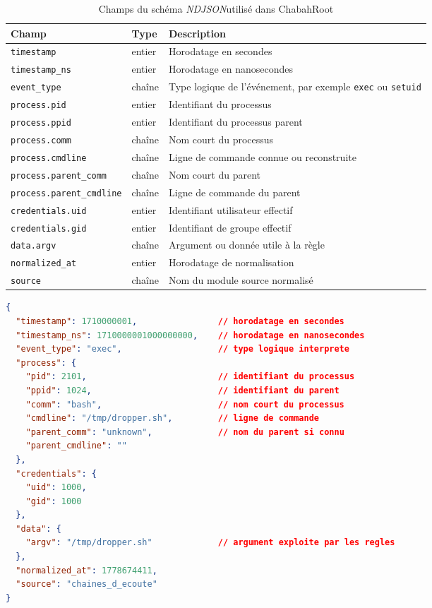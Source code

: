 \documentclass[12pt,a4paper]{report}
\newcommand{\ndjson}{\textit{NDJSON}}
\begin{document}
\begin{table}[h]
\centering
\begin{tabular}{>{\raggedright\arraybackslash}p{3.5cm} >{\raggedright\arraybackslash}p{2.5cm} >{\raggedright\arraybackslash}p{6.5cm}}
\toprule
Champ & Type & Description \\
\midrule
\texttt{timestamp} & entier & Horodatage en secondes \\
\texttt{timestamp\_ns} & entier & Horodatage en nanosecondes \\
\texttt{event\_type} & chaîne & Type logique de l’événement, par exemple \texttt{exec} ou \texttt{setuid} \\
\texttt{process.pid} & entier & Identifiant du processus \\
\texttt{process.ppid} & entier & Identifiant du processus parent \\
\texttt{process.comm} & chaîne & Nom court du processus \\
\texttt{process.cmdline} & chaîne & Ligne de commande connue ou reconstruite \\
\texttt{process.parent\_comm} & chaîne & Nom court du parent \\
\texttt{process.parent\_cmdline} & chaîne & Ligne de commande du parent \\
\texttt{credentials.uid} & entier & Identifiant utilisateur effectif \\
\texttt{credentials.gid} & entier & Identifiant de groupe effectif \\
\texttt{data.argv} & chaîne & Argument ou donnée utile à la règle \\
\texttt{normalized\_at} & entier & Horodatage de normalisation \\
\texttt{source} & chaîne & Nom du module source normalisé \\
\bottomrule
\end{tabular}
\caption{Champs du schéma \ndjson utilisé dans ChabahRoot}
\end{table}

\begin{lstlisting}[language=json,caption={Exemple commenté d’un événement \ndjson normalisé},label={lst:ndjson-exemple}]
{
  "timestamp": 1710000001,                // horodatage en secondes
  "timestamp_ns": 1710000001000000000,    // horodatage en nanosecondes
  "event_type": "exec",                   // type logique interprete
  "process": {
    "pid": 2101,                          // identifiant du processus
    "ppid": 1024,                         // identifiant du parent
    "comm": "bash",                       // nom court du processus
    "cmdline": "/tmp/dropper.sh",         // ligne de commande
    "parent_comm": "unknown",             // nom du parent si connu
    "parent_cmdline": ""
  },
  "credentials": {
    "uid": 1000,
    "gid": 1000
  },
  "data": {
    "argv": "/tmp/dropper.sh"             // argument exploite par les regles
  },
  "normalized_at": 1778674411,
  "source": "chaines_d_ecoute"
}
\end{lstlisting}
\end{document}
